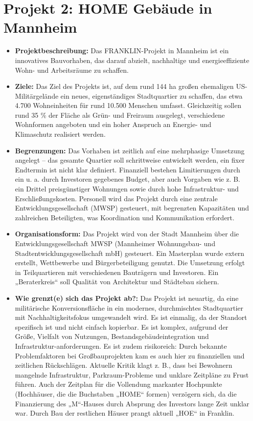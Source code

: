 \documentclass{article}
\begin{document}
\section{Projekt 2: HOME Gebäude in Mannheim}
\begin{itemize}
    \item \textbf{Projektbeschreibung:} 
    Das FRANKLIN-Projekt in Mannheim ist ein innovatives Bauvorhaben, das darauf abzielt,
    nachhaltige und energieeffiziente Wohn- und Arbeitsräume zu schaffen.

    \item \textbf{Ziele:}
    Das Ziel des Projekts ist, auf dem rund 144 ha großen ehemaligen US-Militärgelände ein neues, 
    eigenständiges Stadtquartier zu schaffen, das etwa 4.700 Wohneinheiten für rund 10.500 Menschen umfasst. 
    Gleichzeitig sollen rund 35 \% der Fläche als Grün- und Freiraum ausgelegt, 
    verschiedene Wohnformen angeboten und ein hoher Anspruch an Energie- und Klimaschutz realisiert werden.

    \item \textbf{Begrenzungen:}
    Das Vorhaben ist zeitlich auf eine mehrphasige Umsetzung angelegt – das gesamte Quartier soll schrittweise entwickelt werden, 
    ein fixer Endtermin ist nicht klar definiert. Finanziell bestehen Limitierungen durch ein u. a. durch Investoren gegebenes Budget, 
    aber auch Vorgaben wie z. B. ein Drittel preisgünstiger Wohnungen sowie durch hohe Infrastruktur- und Erschließungskosten. 
    Personell wird das Projekt durch eine zentrale Entwicklungs­gesellschaft (MWSP) gesteuert, mit begrenzten Kapazitäten und zahlreichen Beteiligten, 
    was Koordination und Kommunikation erfordert.

    \item \textbf{Organisationsform:}
    Das Projekt wird von der Stadt Mannheim über die Entwicklungsgesellschaft MWSP (Mannheimer Wohnungsbau- und Stadtentwicklungsgesellschaft mbH) gesteuert. 
    Ein Masterplan wurde extern erstellt, Wettbewerbe und Bürgerbeteiligung genutzt. 
    Die Umsetzung erfolgt in Teilquartieren mit verschiedenen Bauträgern und Investoren. 
    Ein „Beraterkreis“ soll Qualität von Architektur und Städtebau sichern.

    \item \textbf{Wie grenzt(e) sich das Projekt ab?:}
    Das Projekt ist neuartig, da eine militärische Konversionsfläche in ein modernes, 
    durchmischtes Stadtquartier mit Nachhaltigkeitsfokus umgewandelt wird. 
    Es ist einmalig, da der Standort spezifisch ist und nicht einfach kopierbar. 
    Es ist komplex, aufgrund der Größe, Vielfalt von Nutzungen, Bestandsgebäude­integration und Infrastruktur-anforderungen. 
    Es ist zudem risikoreich: Durch bekannte Problemfaktoren bei Großbauprojekten kam es auch hier zu finanziellen und zeitlichen Rückschlägen. 
    Aktuelle Kritik klagt z. B., dass bei Bewohnern mangelnde Infrastruktur, Parkraum-Probleme und unklare Zeitpläne zu Frust führen. 
    Auch der Zeitplan für die Vollendung markanter Hochpunkte (Hochhäuser, die die Buchstaben „HOME“ formen) verzögern sich, 
    da die Finanzierung des „M“-Hauses durch Absprung des Investors lange Zeit unklar war. Durch Bau der restlichen Häuser prangt aktuell „HOE“ in Franklin.


\end{itemize}
\end{document}
